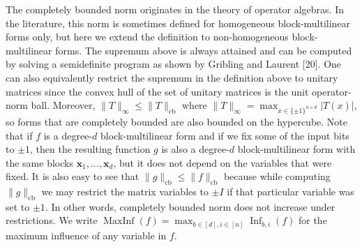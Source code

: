 The completely bounded norm originates in the theory of operator algebras. In the literature, this norm is sometimes defined for homogeneous block-multilinear forms only, but here we extend the definition to non-homogeneous block-multilinear forms.
The supremum above is always attained and can be computed by solving a semidefinite program as shown by Gribling and Laurent [20]. One can also equivalently restrict the supremum in the definition above to unitary matrices since the convex hull of the set of unitary matrices is the unit operator-norm ball. Moreover, $\|T\|_\infty\leq\|T\|_{\mathrm{cb}}$ where $\|T\|_\infty=\max_{x\in\{\pm1\}^{n\times d}}|T(x)|$, so forms that are completely bounded are also bounded on the hypercube.
Note that if $f$ is a degree-$d$ block-multilinear form and if we fix some of the input bits to $\pm1$, then the resulting function $g$ is also a degree-$d$ block-multilinear form with the same blocks $\mathbf x_1,\ldots,\mathbf x_d$, but it does not depend on the variables that were fixed. It is also easy to see that $\|g\|_{\mathrm{cb}}\leq\|f\|_{\mathrm{cb}}$ because while computing $\|g\|_{\mathrm{cb}}$ we may restrict the matrix variables to $\pm I$ if that particular variable was set to $\pm1$. In other words, completely bounded norm does not increase under restrictions.
We write $\operatorname{MaxInf}(f)=\max_{b\in[d],i\in[n]}\operatorname{Inf}_{b,i}(f)$ for the maximum influence of any variable in $f$.
